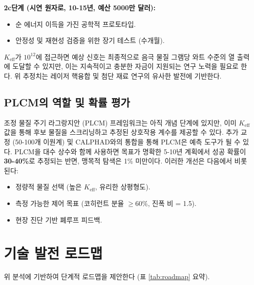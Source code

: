 \documentclass[11pt,a4paper]{article}
\theoremstyle{remark}
\newcommand{\Keff}{K_{\mathrm{eff}}}
\begin{document}
	\textbf{2c단계 (시연 원자로, 10-15년, 예산 5000만 달러):}
	\begin{itemize}
		\item 순 에너지 이득을 가진 공학적 프로토타입.
		\item 안정성 및 재현성 검증을 위한 장기 테스트 (수개월).
	\end{itemize}
	
	\(\Keff\)가 \(10^{12}\)에 접근하면 예상 신호는 최종적으로 음극 물질 그램당 와트 수준의 열 출력에 도달할 수 있지만, 이는 지속적이고 충분한 자금이 지원되는 연구 노력을 필요로 한다. 위 추정치는 레이저 핵융합 및 첨단 재료 연구의 유사한 발전에 기반한다.
	
	\subsection{PLCM의 역할 및 확률 평가}
	
	조정 물질 주기 라그랑지안 (PLCM) 프레임워크는 아직 개념 단계에 있지만, 이미 \(K_{\mathrm{eff}}\) 값을 통해 후보 물질을 스크리닝하고 추정된 상호작용 계수를 제공할 수 있다. 추가 교정 (50-100개 이원계) 및 CALPHAD와의 통합을 통해 PLCM은 예측 도구가 될 수 있다. PLCM을 대수 상수와 함께 사용하면 목표가 명확한 5-10년 계획에서 성공 확률이 \textbf{30-40\%}로 추정되는 반면, 맹목적 탐색은 1\% 미만이다. 이러한 개선은 다음에서 비롯된다:
	\begin{itemize}
		\item 정량적 물질 선택 (높은 \(K_{\mathrm{eff}}\), 유리한 상평형도).
		\item 측정 가능한 제어 목표 (코히런트 분율 \(\geq 60\%\), 진폭 비 = 1.5).
		\item 현장 진단 기반 폐루프 피드백.
	\end{itemize}
	
	\section{기술 발전 로드맵}
	\label{sec:roadmap}
	
	위 분석에 기반하여 단계적 로드맵을 제안한다 (표 \ref{tab:roadmap} 요약).
	
\end{document}
